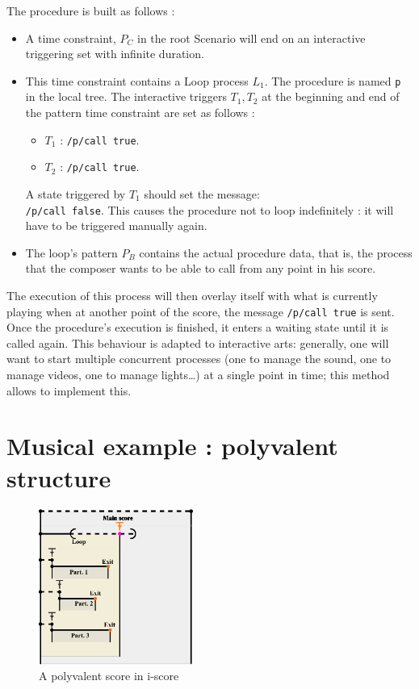 \documentclass{article}
\begin{document}
The procedure is built as follows : 
\begin{itemize}
    \item A time constraint, $P_C$ in the root Scenario will end on an interactive triggering set with infinite duration.
    \item This time constraint contains a Loop process $L_1$. 
    The procedure is named \lstinline{p} in the local tree. 
    The interactive triggers $T_1, T_2$ at the beginning and end of the pattern time constraint are set as follows : 
    \begin{itemize}
        \item $T_1$ : \lstinline{/p/call true}.
        \item $T_2$ : \lstinline{/p/call true}.
    \end{itemize}
    A state triggered by $T_1$ should set the message:~\\
    \lstinline{/p/call false}. 
    This causes the procedure not to loop 
    indefinitely : it will have to be triggered manually again.
    \item The loop's pattern $P_B$ contains the actual procedure data, that is, the process that the composer wants to be able to call from any point in his score. 
\end{itemize}

The execution of this process will then overlay itself with what is currently playing when at another point of the score, 
the message \lstinline{/p/call true} is sent.
Once the procedure's execution is finished, it enters a waiting state until it is called again.
This behaviour is adapted to interactive arts: generally, one will want to start multiple 
concurrent processes (one to manage the sound, one to manage videos, one to manage lights\dots) at a single point in time; this method allows to implement this.

\section{Musical example : polyvalent structure}
\begin{figure}[h]
    \centering
    \includegraphics[width=0.45\textwidth]{images/partition.eps}
    \caption{A polyvalent score in i-score}
    \label{fig.polyvalent}
\end{figure}
\end{document}
